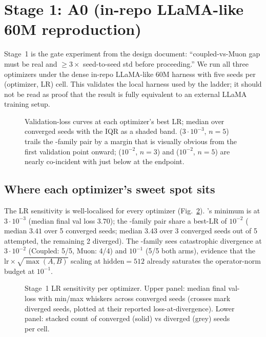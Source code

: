 \section{Stage 1: A0 (in-repo LLaMA-like 60M reproduction)}\label{sec:stage1}

Stage~1 is the gate experiment from the design document: ``coupled-vs-Muon gap must be real and $\geq 3\times$ seed-to-seed std before proceeding.'' We run all three optimizers under the dense in-repo LLaMA-like 60M harness with five seeds per (optimizer, LR) cell. This validates the local harness used by the ladder; it should not be read as proof that the result is fully equivalent to an external LLaMA training setup.

\begin{figure}[h]
\centering
{}
\caption{Validation-loss curves at each optimizer's best LR; median over converged seeds with the IQR as a shaded band. \optAdamW{} ($3\!\cdot\!10^{-3}$, $n{=}5$) trails the \optMuon-family pair by a margin that is visually obvious from the first validation point onward; \optMuon{} ($10^{-2}$, $n{=}3$) and \optCoupled{} ($10^{-2}$, $n{=}5$) are nearly co-incident with \optCoupled{} just below \optMuon{} at the endpoint.}\label{fig:stage1-curves}
\end{figure}

\subsection{Where each optimizer's sweet spot sits}

The LR sensitivity is well-localised for every optimizer (Fig.~\ref{fig:stage1-lr-sens}). \optAdamW{}'s minimum is at $3\!\cdot\!10^{-3}$ (median final val loss $3.70$); the \optMuon-family pair share a best-LR of $10^{-2}$ (\optCoupled{} median $3.41$ over 5 converged seeds; \optMuon{} median $3.43$ over 3 converged seeds out of 5 attempted, the remaining 2 diverged). The \optMuon-family sees catastrophic divergence at $3\!\cdot\!10^{-2}$ (Coupled: 5/5, Muon: 4/4) and $10^{-1}$ (5/5 both arms), evidence that the $\mathrm{lr} \times \sqrt{\max(A,B)}$ scaling at $\mathrm{hidden}{=}512$ already saturates the operator-norm budget at $10^{-1}$.

\begin{figure}[h]
\centering
{}
\caption{Stage~1 LR sensitivity per optimizer. Upper panel: median final val-loss with min/max whiskers across converged seeds (crosses mark diverged seeds, plotted at their reported loss-at-divergence). Lower panel: stacked count of converged (solid) vs diverged (grey) seeds per cell.}\label{fig:stage1-lr-sens}
\end{figure}

